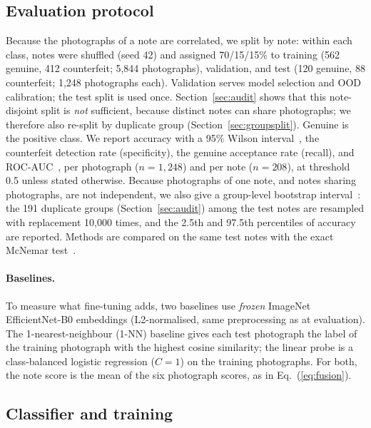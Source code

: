 \documentclass[pdflatex,sn-mathphys-num]{sn-jnl}
\begin{document}
\subsection{Evaluation protocol}\label{sec:protocol}

Because the photographs of a note are correlated, we split by note: within each class,
notes were shuffled (seed 42) and assigned 70/15/15\% to training (562 genuine, 412
counterfeit; 5{,}844 photographs), validation, and test (120 genuine, 88 counterfeit;
1{,}248 photographs each). Validation serves model selection and OOD calibration; the
test split is used once. Section~\ref{sec:audit} shows that this note-disjoint split is
\emph{not} sufficient, because distinct notes can share photographs; we therefore also
re-split by duplicate group (Section~\ref{sec:groupsplit}). Genuine is the
positive class. We report accuracy with a 95\% Wilson
interval~\cite{wilson1927probable}, the counterfeit detection rate (specificity), the
genuine acceptance rate (recall), and ROC-AUC~\cite{fawcett2006roc}, per photograph
($n=1{,}248$) and per note ($n=208$), at threshold 0.5 unless stated otherwise.
Because photographs of one note, and notes sharing photographs, are not independent,
we also give a group-level bootstrap
interval~\cite{efron1993bootstrap}: the 191 duplicate groups (Section~\ref{sec:audit})
among the test notes are resampled with replacement 10{,}000 times, and the 2.5th and
97.5th percentiles of accuracy are reported. Methods are compared on the same test notes
with the exact McNemar test~\cite{mcnemar1947,dietterich1998tests}.

\paragraph{Baselines.} To measure what fine-tuning adds, two baselines use \emph{frozen}
ImageNet EfficientNet-B0 embeddings (L2-normalised, same preprocessing as at
evaluation). The 1-nearest-neighbour (1-NN) baseline gives each test photograph the
label of the training photograph with the highest cosine similarity; the linear probe is
a class-balanced logistic regression ($C=1$) on the training photographs. For both, the
note score is the mean of the six photograph scores, as in Eq.~(\ref{eq:fusion}).

\subsection{Classifier and training}\label{sec:training}
\end{document}
